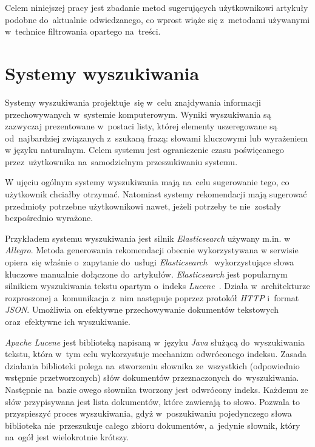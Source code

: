 \documentclass[pl]{minipw} %
\begin{document}
Celem niniejszej pracy jest zbadanie metod sugerujących użytkownikowi artykuły podobne do~aktualnie odwiedzanego, co wprost wiąże się z~metodami używanymi w~technice filtrowania opartego na~treści.

\section{Systemy wyszukiwania}

Systemy wyszukiwania projektuje~się w~celu znajdywania informacji przechowywanych w~systemie komputerowym. Wyniki wyszukiwania są zazwyczaj prezentowane w~postaci listy, której elementy uszeregowane są od~najbardziej związanych z~szukaną frazą: słowami kluczowymi lub wyrażeniem w języku naturalnym. Celem systemu jest ograniczenie czasu poświęcanego przez~użytkownika na~samodzielnym przeszukiwaniu systemu.

W ujęciu ogólnym systemy wyszukiwania mają na~celu sugerowanie tego, co użytkownik chciałby otrzymać. Natomiast systemy rekomendacji mają sugerować przedmioty potrzebne użytkownikowi nawet, jeżeli potrzeby te nie~zostały bezpośrednio wyrażone.

Przykładem systemu wyszukiwania jest silnik \textit{Elasticsearch} używany m.in. w \textit{Allegro}. Metoda generowania rekomendacji obecnie wykorzystywana w serwisie opiera~się właśnie o~zapytanie do~usługi \textit{Elasticsearch}~\cite{elastic} wykorzystujące słowa kluczowe manualnie dołączone do~artykułów. \textit{Elasticsearch} jest popularnym silnikiem wyszukiwania tekstu opartym o~indeks \textit{Lucene}~\cite{lucene}. Działa w~architekturze rozproszonej a~komunikacja z~nim następuje poprzez protokół \textit{HTTP} i~format \textit{JSON}. Umożliwia on efektywne przechowywanie dokumentów tekstowych oraz~efektywne ich wyszukiwanie.

\textit{Apache Lucene} jest biblioteką napisaną w~języku \textit{Java} służącą do~wyszukiwania tekstu, która w~tym celu wykorzystuje mechanizm odwróconego indeksu. Zasada działania biblioteki polega na~stworzeniu słownika ze~wszystkich (odpowiednio wstępnie przetworzonych) słów dokumentów przeznaczonych do~wyszukiwania. Następnie na~bazie owego słownika tworzony jest odwrócony indeks. Każdemu ze słów przypisywana jest lista dokumentów, które zawierają to słowo. Pozwala to przyspieszyć proces wyszukiwania, gdyż w~poszukiwaniu pojedynczego słowa biblioteka nie~przeszukuje całego zbioru dokumentów, a~jedynie słownik, który na~ogół jest wielokrotnie krótszy.
\end{document}
